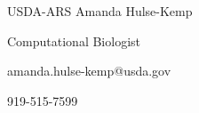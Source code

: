 \begin{cventries}


  \cventry
    {USDA-ARS} %
    {Amanda Hulse-Kemp} %
    {} %
    {} %
    {
      \begin{cvitems} %
        \item {Computational Biologist}
        \item {amanda.hulse-kemp@usda.gov}
        \item {919-515-7599}
      \end{cvitems}
    }

    
\end{cventries}